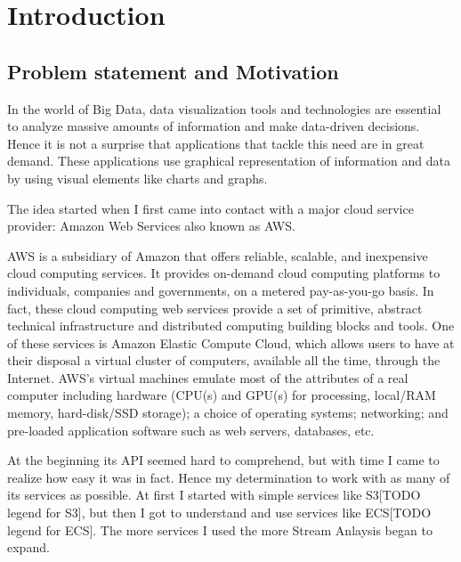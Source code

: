 \chapter{Introduction}
\label{chap:01}

\section{Problem statement and Motivation}
\label{chap:01:01}
In the world of Big Data, data visualization tools and technologies are essential to analyze massive amounts of information and make data-driven decisions. Hence it is not a surprise that applications that tackle this need are in great demand. These applications use graphical representation of information and data by using visual elements like charts and graphs.

The idea started when I first came into contact with a major cloud service provider: Amazon Web Services also known as AWS.

AWS is a subsidiary of Amazon that offers reliable, scalable, and inexpensive cloud computing services. It provides on-demand cloud computing platforms to individuals, companies and governments, on a metered pay-as-you-go basis. In fact, these cloud computing web services provide a set of primitive, abstract technical infrastructure and distributed computing building blocks and tools. One of these services is Amazon Elastic Compute Cloud, which allows users to have at their disposal a virtual cluster of computers, available all the time, through the Internet. AWS's virtual machines emulate most of the attributes of a real computer including hardware (CPU(s) and GPU(s) for processing, local/RAM memory, hard-disk/SSD storage); a choice of operating systems; networking; and pre-loaded application software such as web servers, databases, etc. \cite{aws-overview}

At the beginning its API seemed hard to comprehend, but with time I came to realize how easy it was in fact. Hence my determination to work with as many of its services as possible. At first I started with simple services like S3[TODO legend for S3], but then I got to understand and use services like ECS[TODO legend for ECS]. The more services I used the more Stream Anlaysis began to expand.


